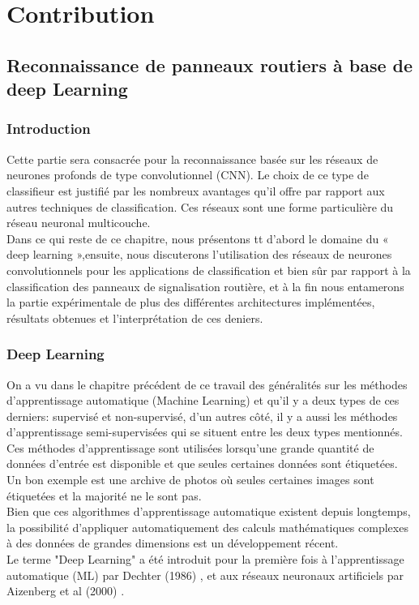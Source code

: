 \part{Contribution}
\label{chap:deuxiemme}

\chapter{Reconnaissance de panneaux routiers à base de deep Learning}

\section{Introduction}

Cette partie sera consacrée pour la reconnaissance basée sur les réseaux de neurones profonds de type convolutionnel (CNN). Le choix de ce type de classifieur est justifié par les nombreux avantages qu’il offre par rapport aux autres techniques de classification. Ces réseaux sont une forme particulière du réseau neuronal multicouche.\\
Dans ce qui reste de ce chapitre, nous présentons tt d’abord le domaine du « deep learning »,ensuite, nous discuterons l’utilisation des réseaux de neurones convolutionnels pour les applications de classification et bien sûr par rapport à la classification des panneaux de signalisation routière, et à la fin nous entamerons la partie expérimentale de plus des différentes architectures implémentées, résultats obtenues et l’interprétation de ces deniers.

\section{Deep Learning}

On a vu dans le chapitre précédent de ce travail des généralités sur les méthodes d’apprentissage automatique (Machine Learning) et qu’il y a deux types de ces derniers: supervisé et non-supervisé, d’un autres côté, il y a aussi les méthodes d'apprentissage semi-supervisées qui se situent entre les deux types mentionnés.\\
Ces méthodes d'apprentissage sont utilisées lorsqu'une grande quantité de données d'entrée est disponible et que seules certaines données sont étiquetées. Un bon exemple est une archive de photos où seules certaines images sont étiquetées et la majorité ne le sont pas.\\
Bien que ces algorithmes d'apprentissage automatique existent depuis longtemps, la possibilité d'appliquer automatiquement des calculs mathématiques complexes à des données de grandes dimensions est un développement récent.\\
Le terme "Deep Learning" a été introduit pour la première fois à l’apprentissage automatique (ML) par Dechter (1986) \cite{45}, et aux réseaux neuronaux artificiels par Aizenberg et al (2000) \cite{46}.

